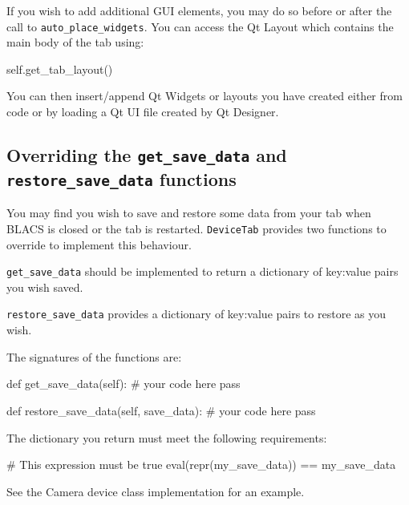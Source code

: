\documentclass[12pt]{article}
\begin{document}
If you wish to add additional GUI elements, you may do so before or after the call to \texttt{auto\_place\_widgets}.
You can access the Qt Layout which contains the main body of the tab using:
\begin{python}
    self.get_tab_layout()
\end{python}
You can then insert/append Qt Widgets or layouts you have created either from code or by loading a Qt UI file created by Qt Designer.



\subsection{Overriding the \texttt{get\_save\_data} and \texttt{restore\_save\_data} functions}
You may find you wish to save and restore some data from your tab when BLACS is closed or the tab is restarted.
\texttt{DeviceTab} provides two functions to override to implement this behaviour.

\texttt{get\_save\_data} should be implemented to return a dictionary of key:value pairs you wish saved.

\texttt{restore\_save\_data} provides a dictionary of key:value pairs to restore as you wish.

The signatures of the functions are:
\begin{python}
def get_save_data(self):
	# your code here
	pass
	
def restore_save_data(self, save_data):
	# your code here
	pass
\end{python}

The dictionary you return must meet the following requirements:
\begin{python}
# This expression must be true
eval(repr(my_save_data)) == my_save_data 
\end{python}

See the Camera device class implementation for an example.
\end{document}
